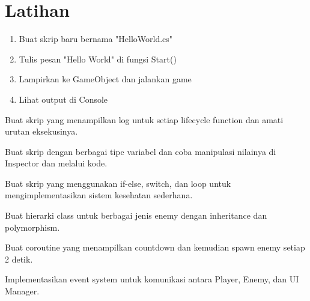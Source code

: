 \section{Latihan}

\begin{latihan}
\begin{enumerate}
\item Buat skrip baru bernama "HelloWorld.cs"
\item Tulis pesan "Hello World" di fungsi Start()
\item Lampirkan ke GameObject dan jalankan game
\item Lihat output di Console
\end{enumerate}
\end{latihan}

\begin{latihan}
Buat skrip yang menampilkan log untuk setiap lifecycle function dan amati urutan eksekusinya.
\end{latihan}

\begin{latihan}
Buat skrip dengan berbagai tipe variabel dan coba manipulasi nilainya di Inspector dan melalui kode.
\end{latihan}

\begin{latihan}
Buat skrip yang menggunakan if-else, switch, dan loop untuk mengimplementasikan sistem kesehatan sederhana.
\end{latihan}

\begin{latihan}[OOP]
Buat hierarki class untuk berbagai jenis enemy dengan inheritance dan polymorphism.
\end{latihan}

\begin{latihan}[Coroutine]
Buat coroutine yang menampilkan countdown dan kemudian spawn enemy setiap 2 detik.
\end{latihan}

\begin{latihan}
Implementasikan event system untuk komunikasi antara Player, Enemy, dan UI Manager.
\end{latihan}
